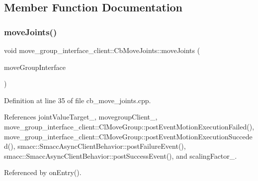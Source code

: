 \subsection{Member Function Documentation}
\mbox{\label{classmove__group__interface__client_1_1CbMoveJoints_aa60670293a8fafcb6e091b85af722822}} 
\subsubsection{\texorpdfstring{move\+Joints()}{moveJoints()}}
{\footnotesize\ttfamily void move\+\_\+group\+\_\+interface\+\_\+client\+::\+Cb\+Move\+Joints\+::move\+Joints (\begin{DoxyParamCaption}\item[{moveit\+::planning\+\_\+interface\+::\+Move\+Group\+Interface \&}]{move\+Group\+Interface }\end{DoxyParamCaption})\hspace{0.3cm}{\ttfamily [protected]}}



Definition at line 35 of file cb\+\_\+move\+\_\+joints.\+cpp.



References joint\+Value\+Target\+\_\+, movegroup\+Client\+\_\+, move\+\_\+group\+\_\+interface\+\_\+client\+::\+Cl\+Move\+Group\+::post\+Event\+Motion\+Execution\+Failed(), move\+\_\+group\+\_\+interface\+\_\+client\+::\+Cl\+Move\+Group\+::post\+Event\+Motion\+Execution\+Succeded(), smacc\+::\+Smacc\+Async\+Client\+Behavior\+::post\+Failure\+Event(), smacc\+::\+Smacc\+Async\+Client\+Behavior\+::post\+Success\+Event(), and scaling\+Factor\+\_\+.



Referenced by on\+Entry().


